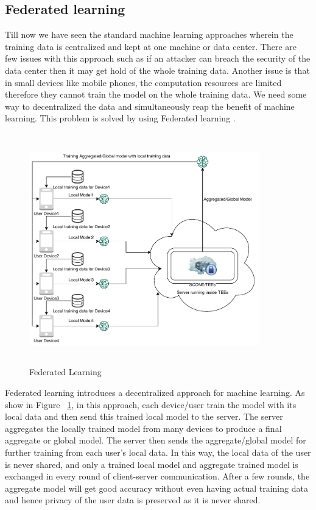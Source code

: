 \subsection{Federated learning}
\label{sec:flTEE}
Till now we have seen the standard machine learning approaches wherein the training data is centralized and kept at one machine or data center. There are few issues with this approach such as if an attacker can breach the security of the data center then it may get hold of the whole training data. Another issue is that in small devices like mobile phones, the computation resources are limited therefore they cannot train the model on the whole training data. We need some way to decentralized the data and simultaneously reap the benefit of machine learning. This problem is solved by using Federated learning \cite{86}.

\begin{figure}[h!]
    \centering
    \includegraphics[width=10cm, height=10cm]{images/FL.pdf}
    \caption{Federated Learning}
    \label{fig:fld}
\end{figure}

Federated learning introduces a decentralized approach for machine learning. As show in Figure ~\ref{fig:fld}, in this approach, each device/user train the model with its local data and then send this trained local model to the server. The server aggregates the locally trained model from many devices to produce a final aggregate or global model. The server then sends the aggregate/global model for further training from each user's local data. In this way, the local data of the user is never shared, and only a trained local model and aggregate trained model is exchanged in every round of client-server communication. After a few rounds, the aggregate model will get good accuracy without even having actual training data and hence privacy of the user data is preserved as it is never shared.

